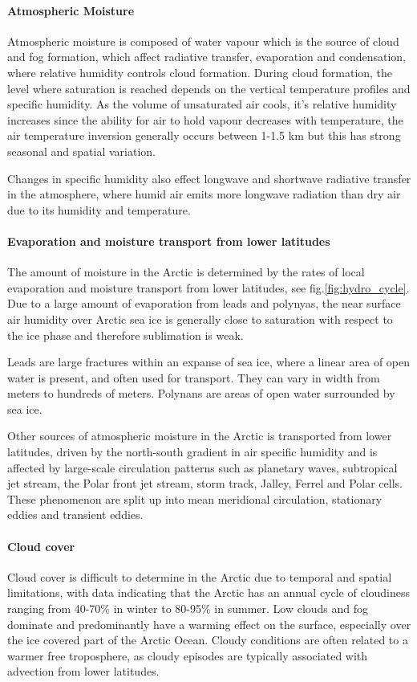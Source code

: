 \documentclass[12pt, oneside]{article}
\begin{document}
\paragraph{Atmospheric Moisture}
Atmospheric moisture is composed of water vapour which is the source of cloud and fog formation, which affect radiative transfer, evaporation and condensation, where relative humidity controls cloud formation. During cloud formation, the level where saturation is reached depends on the vertical temperature profiles and specific humidity. As the volume of unsaturated air cools, it's relative humidity increases since the ability for air to hold vapour decreases with temperature, the air temperature inversion generally occurs between 1-1.5 km but this has strong seasonal and spatial variation. 

Changes in specific humidity also effect longwave and shortwave radiative transfer in the atmosphere, where humid air emits more longwave radiation than dry air due to its humidity and temperature. 

\paragraph{Evaporation and moisture transport from lower latitudes}
The amount of moisture in the Arctic is determined by the rates of local evaporation and moisture transport from lower latitudes, see fig.\ref{fig:hydro_cycle}. Due to a large amount of evaporation from leads and polynyas, the near surface air humidity over Arctic sea ice is generally close to saturation with respect to the ice phase and therefore sublimation is weak. 

Leads are large fractures within an expanse of sea ice, where a linear area of open water is present, and often used for transport. They can vary in width from meters to hundreds of meters. Polynans are areas of open water surrounded by sea ice.

Other sources of atmospheric moisture in the Arctic is transported from lower latitudes, driven by the north-south gradient in air specific humidity and is affected by large-scale circulation patterns such as planetary waves, subtropical jet stream, the Polar front jet stream, storm track, Jalley, Ferrel and Polar cells. These phenomenon are split up into mean meridional circulation, stationary eddies and transient eddies. 


\paragraph{Cloud cover}
Cloud cover is difficult to determine in the Arctic due to temporal and spatial limitations, with data indicating that the Arctic has an annual cycle of cloudiness ranging from 40-70\% in winter to 80-95\% in summer. Low clouds and fog dominate and predominantly have a warming effect on the surface, especially over the ice covered part of the Arctic Ocean. Cloudy conditions are often related to a warmer free troposphere, as cloudy episodes are typically associated with advection from lower latitudes. 
\end{document}
